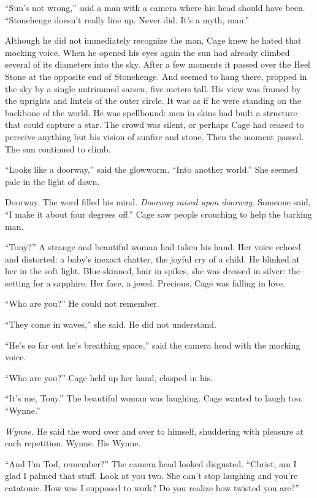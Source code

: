 ``Sun's not wrong,'' said a man with a camera where his head should have been. ``Stonehenge doesn't really line up. Never did. It's a myth, man.''

Although he did not immediately recognize the man, Cage knew he hated that mocking voice. When he opened his eyes again the sun had already climbed several of its diameters into the sky. After a few moments it passed over the Heel Stone at the opposite end of Stonehenge. And seemed to hang there, propped in the sky by a single untrimmed sarsen, five meters tall. His view was framed by the uprights and lintels of the outer circle. It was as if he were standing on the backbone of the world. He was spellbound: men in skins had built a structure that could capture a star. The crowd was silent, or perhaps Cage had ceased to perceive anything but his vision of sunfire and stone. Then the moment passed. The sun continued to climb.

``Looks like a doorway,'' said the glowworm. ``Into another world.'' She seemed pale in the light of dawn.

Doorway. The word filled his mind. \textit{Doorway raised upon doorway.} Someone said, ``I make it about four degrees off.'' Cage saw people crouching to help the barking man.

``Tony?'' A strange and beautiful woman had taken his hand. Her voice echoed and distorted: a baby's inexact chatter, the joyful cry of a child. He blinked at her in the soft light. Blue-skinned, hair in spikes, she was dressed in silver: the setting for a sapphire. Her face, a jewel. Precious. Cage was falling in love.

``Who are you?'' He could not remember.

``They come in waves,'' she said. He did not understand.

``He's so far out he's breathing space,'' said the camera head with the mocking voice.

``Who are you?'' Cage held up her hand, clasped in his.

``It's me, Tony.'' The beautiful woman was laughing. Cage wanted to laugh too. ``Wynne.''

\textit{Wynne.} He said the word over and over to himself, shuddering with pleasure at each repetition. Wynne. His Wynne.

``And I'm Tod, remember?'' The camera head looked disgusted. ``Christ, am I glad I palmed that stuff. Look at you two. She can't stop laughing and you're catatonic. How was I supposed to work? Do you realize how twisted you are?''

